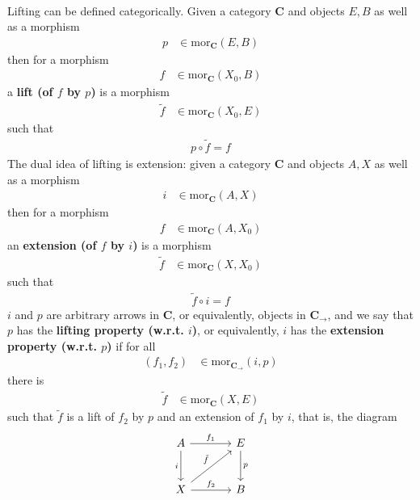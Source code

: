 \\
Lifting can be defined categorically.
Given a category $\mathbf{C}$ and objects $E,B$ as well as a morphism
\begin{align*}
  p
  &\in
  \mathrm{mor}_{\mathbf{C}}(E,B)
\end{align*}
then for a morphism
\begin{align*}
  f
  &\in
  \mathrm{mor}_{\mathbf{C}}(X_{0},B)
\end{align*}
a \textbf{lift (of $f$ by $p$)} is a morphism
\begin{align*}
  \tilde{f}
  &\in
  \mathrm{mor}_{\mathbf{C}}(X_{0},E)
\end{align*}
such that
\begin{align*}
  p
  \circ
  \tilde{f}
  =
  f
\end{align*}
The dual idea of lifting is extension: given a category $\mathbf{C}$ and objects $A,X$ as well as a morphism
\begin{align*}
  i
  &\in
  \mathrm{mor}_{\mathbf{C}}(A,X)
\end{align*}
then for a morphism
\begin{align*}
  f
  &\in
  \mathrm{mor}_{\mathbf{C}}(A,X_{0})
\end{align*}
an \textbf{extension (of $f$ by $i$)} is a morphism
\begin{align*}
  \tilde{f}
  &\in
  \mathrm{mor}_{\mathbf{C}}(X,X_{0})
\end{align*}
such that
\begin{align*}
  \tilde{f}
  \circ
  i
  =
  f
\end{align*}
$i$ and $p$ are arbitrary arrows in $\mathbf{C}$, or equivalently, objects in $\mathbf{C}_{\rightarrow}$, and we say that $p$ has the \textbf{lifting property (w.r.t. $i$)}, or equivalently, $i$ has the \textbf{extension property (w.r.t. $p$)} if for all
\begin{align*}
  (f_{1},f_{2})
  &\in
  \mathrm{mor}_{\mathbf{C}_{\rightarrow}}(i,p)
\end{align*}
there is
\begin{align*}
  \tilde{f}
  &\in
  \mathrm{mor}_{\mathbf{C}}(X,E)
\end{align*}
such that $\tilde{f}$ is a lift of $f_{2}$ by $p$ and an extension of $f_{1}$ by $i$, that is, the diagram
\[
\begin{tikzcd}[sep=large]
  A
  \arrow{r}{f_{1}}
  \arrow[swap]{d}{i}
  &
  E
  \arrow{d}{p}
  \\
  X
  \arrow{ur}{\tilde{f}}
  \arrow{r}{f_{2}}
  &
  B
\end{tikzcd}
\]
